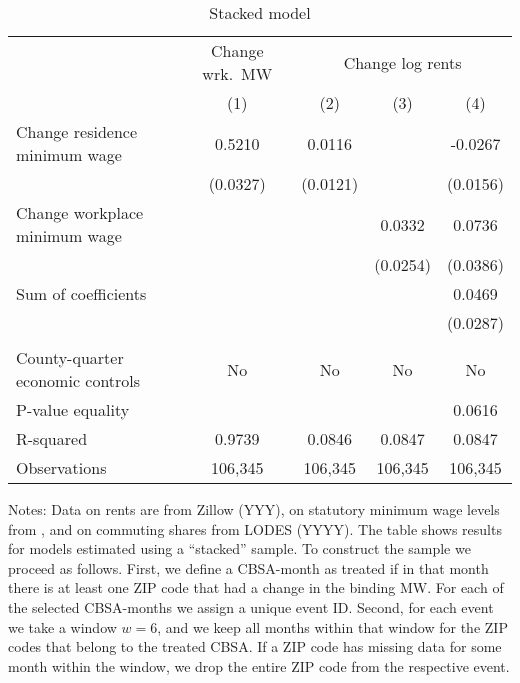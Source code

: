 \begin{table}[hbt!] \centering
	\caption{Stacked model}
	\label{tab:stacked}
	\begin{tabular}{l*{4}{c}}
		\toprule
		& \multicolumn{1}{c}{Change wrk.\ MW}
		& \multicolumn{3}{c}{Change log rents}                            \\ \cmidrule(lr){2-2}\cmidrule(lr){3-5}
		                                   & (1)   & (2)   & (3)   & (4)      \\ \midrule
		Change residence minimum wage      &  0.5210  &  0.0116  &       &  -0.0267     \\
		                                   & (0.0327) & (0.0121) &       & (0.0156)    \\
		Change workplace minimum wage      &       &       &  0.0332  & 0.0736      \\
		                                   &       &       & (0.0254) & (0.0386)    \\ \midrule
		Sum of coefficients                &       &       &       &  0.0469     \\
		                                   &       &       &       & (0.0287)    \\
		                                   &       &       &       &          \\ \midrule
		County-quarter economic controls   &  No   & No   & No     & No      \\
		P-value equality                   &       &       &       & 0.0616      \\
		R-squared                          &  0.9739  &  0.0846  &  0.0847  & 0.0847      \\
		Observations                       & 106,345  & 106,345  & 106,345  & 106,345     \\\bottomrule
	\end{tabular}
    
    \begin{minipage}{.95\textwidth} \footnotesize
        \vspace{2mm}
        Notes: Data on rents are from Zillow (YYY), on statutory minimum wage levels
        from \textcite{VaghulZipperer2016, BerkeleyLaborCenter}, and on commuting 
        shares from LODES (YYYY).
        The table shows results for models estimated using a ``stacked'' sample.
        To construct the sample we proceed as follows.
        First, we define a CBSA-month as treated if in that month there is at least one ZIP 
        code that had a change in the binding MW.
        For each of the selected CBSA-months we assign a unique event ID. 
        Second, for each event we take a window $w = 6$, and we keep all months within that 
        window for the ZIP codes that belong to the treated CBSA.
        If a ZIP code has missing data for some month within the window, we drop the entire 
        ZIP code from the respective event. 
    \end{minipage}
\end{table}
